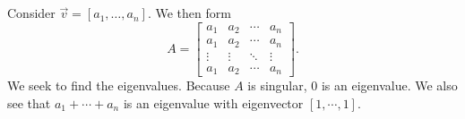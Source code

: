         \vphantom 
        \\
        \\
        Consider \(\vec{v}=[a_1,\ldots,a_n]\). We then form
        \begin{equation*}
            A=\begin{bmatrix}
                a_1 & a_2 & \cdots & a_n \\
                a_1 & a_2 & \cdots & a_n \\
                \vdots & \vdots & \ddots & \vdots \\
                a_1 & a_2 & \cdots & a_n
            \end{bmatrix}.
        \end{equation*}
        We seek to find the eigenvalues. Because \(A\) is singular, \(0\) is an eigenvalue. We also see that \(a_1+\cdots+a_n\) is an eigenvalue with eigenvector \([1,\cdots,1]\).